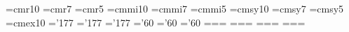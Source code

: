 \font\tenrm=cmr10 \font\sevenrm=cmr7 \font\fiverm=cmr5
\font\teni=cmmi10 \font\seveni=cmmi7 \font\fivei=cmmi5
\font\tensy=cmsy10 \font\sevensy=cmsy7 \font\fivesy=cmsy5
\font\tenex=cmex10
\skewchar\teni='177 \skewchar\seveni='177 \skewchar\fivei='177
\skewchar\tensy='60 \skewchar\sevensy='60 \skewchar\fivesy='60
=\tenrm {}=\sevenrm {}=\fiverm
{}=\teni {}=\seveni {}=\fivei
{}=\tensy {}=\sevensy {}=\fivesy
{}=\tenex {}=\tenex {}=\tenex
